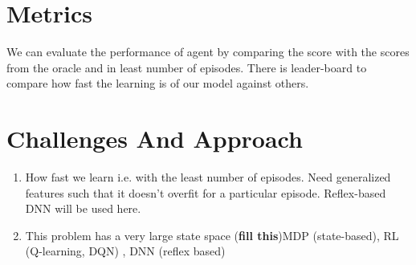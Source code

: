 \documentclass[12pt]{article}
\begin{document}
\section{Metrics}
We can evaluate the performance of agent by comparing the score with the scores from the oracle and in least number of episodes. There is leader-board to compare how fast the learning is of our model against others. \citep{leaderboard}

\section{Challenges And Approach}
\begin{enumerate}[label=(\alph*)]
\item How fast we learn i.e. with the least number of episodes. Need generalized features such that it doesn’t overfit for a particular episode. Reflex-based DNN will be used here.
\item This problem has a very large state space (\textbf{fill this})MDP (state-based), RL (Q-learning, DQN) , DNN (reflex based)
\end{enumerate}



\end{document}
